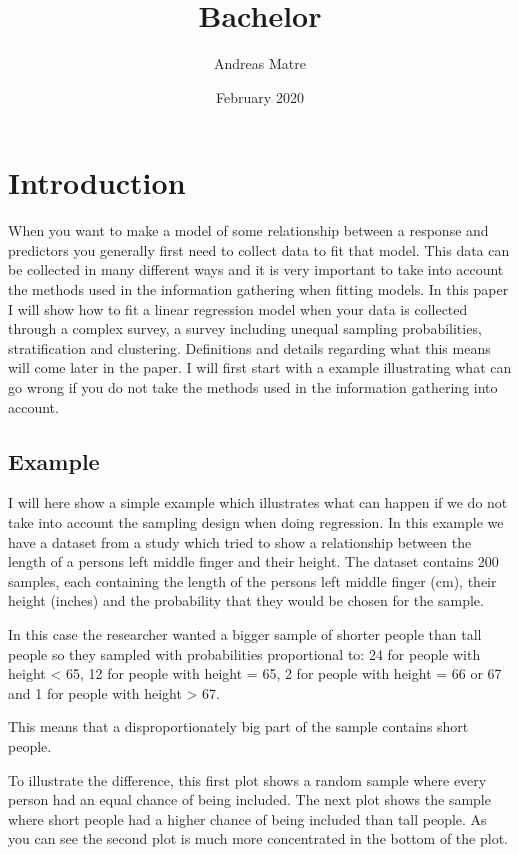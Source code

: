 \documentclass{article}
\title{Bachelor}
\author{Andreas Matre}
\date{February 2020}
\begin{document}
\maketitle

\section{Introduction}

When you want to make a model of some relationship between a response and predictors you generally first need to collect data to fit that model. This data can be collected in many different ways and it is very important to take into account the methods used in the information gathering when fitting models. In this paper I will show how to fit a linear regression model when your data is collected through a complex survey, a survey including unequal sampling probabilities, stratification and clustering. Definitions and details regarding what this means will come later in the paper. I will first start with a example illustrating what can go wrong if you do not take the methods used in the information gathering into account.


\subsection{Example}

I will here show a simple example which illustrates what can happen if we do not take into account the sampling design when doing regression. In this example we have a dataset from a study which tried to show a relationship between the length of a persons left middle finger and their height. The dataset contains 200 samples, each containing the length of the persons left middle finger (cm), their height (inches) and the probability that they would be chosen for the sample.

In this case the researcher wanted a bigger sample of shorter people than tall people so they sampled with probabilities proportional to: 24 for people with height < 65, 12 for people with height = 65, 2 for people with height = 66 or 67 and 1 for people with height > 67.


This means that a disproportionately big part of the sample contains short people. 

To illustrate the difference, this first plot shows a random sample where every person had an equal chance of being included. The next plot shows the sample where short people had a higher chance of being included than tall people. As you can see the second plot is much more concentrated in the bottom of the plot.
\end{document}
